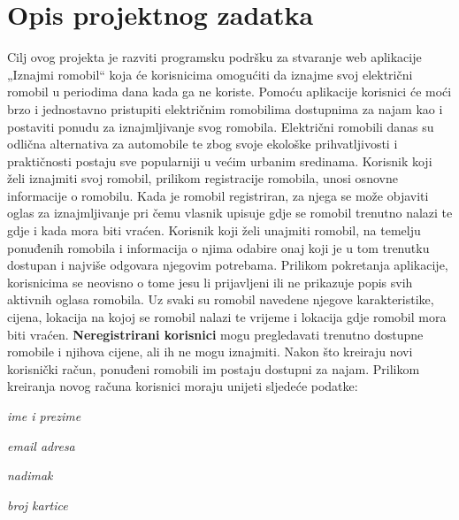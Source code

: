 \chapter{Opis projektnog zadatka}
		
		Cilj ovog projekta je razviti programsku podršku za stvaranje web aplikacije „Iznajmi romobil“ koja će korisnicima omogućiti da iznajme svoj električni romobil u periodima dana kada ga ne koriste. Pomoću aplikacije korisnici će moći brzo i jednostavno pristupiti električnim romobilima dostupnima za najam kao i postaviti ponudu za iznajmljivanje svog romobila. Električni romobili danas su odlična alternativa za automobile te zbog svoje ekološke prihvatljivosti i praktičnosti postaju sve popularniji u većim urbanim sredinama. Korisnik koji želi iznajmiti svoj romobil, prilikom registracije romobila, unosi osnovne informacije o romobilu. Kada je romobil registriran, za njega se može objaviti oglas za iznajmljivanje pri čemu vlasnik upisuje gdje se romobil trenutno nalazi te gdje i kada mora biti vraćen. Korisnik koji želi unajmiti romobil, na temelju ponuđenih romobila i informacija o njima odabire onaj koji je u tom trenutku dostupan i najviše odgovara njegovim potrebama. 
		\newline 
		\newline
		Prilikom pokretanja aplikacije, korisnicima se neovisno o tome jesu li prijavljeni ili ne prikazuje popis svih aktivnih oglasa romobila. Uz svaki su romobil navedene njegove karakteristike, cijena, lokacija na kojoj se romobil nalazi te vrijeme i lokacija gdje romobil mora biti vraćen. \textbf{Neregistrirani korisnici} mogu pregledavati trenutno dostupne romobile i njihova cijene, ali ih ne mogu iznajmiti. Nakon što kreiraju novi korisnički račun, ponuđeni romobili im postaju dostupni za najam. Prilikom kreiranja novog računa korisnici moraju unijeti sljedeće podatke:
		
		\begin{packed_item}
			\item \textit{ime i prezime}
			\item \textit{email adresa}
			\item \textit{nadimak}
			\item \textit{broj kartice}
		\end{packed_item}
		
